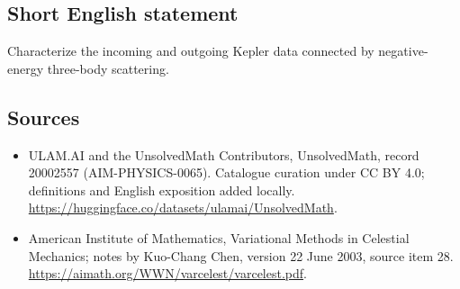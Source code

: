 \documentclass[11pt]{article}
\begin{document}
\subsection{Short English statement}
Characterize the incoming and outgoing Kepler data connected by negative-energy three-body scattering.
\subsection{Sources}
\begin{itemize}
\item[\hypertarget{source:20002557:1}{S1}] ULAM.AI and the UnsolvedMath Contributors, UnsolvedMath, record 20002557 (AIM-PHYSICS-0065). Catalogue curation under CC BY 4.0; definitions and English exposition added locally.
\url{https://huggingface.co/datasets/ulamai/UnsolvedMath}.
\item[\hypertarget{source:20002557:2}{S2}] American Institute of Mathematics, Variational Methods in Celestial Mechanics; notes by Kuo-Chang Chen, version 22 June 2003, source item 28.
\url{https://aimath.org/WWN/varcelest/varcelest.pdf}.
\end{itemize}
\label{end:20002557}
\end{document}
